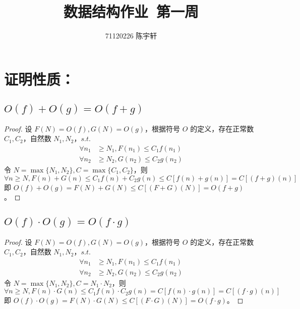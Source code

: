\documentclass{ctexart}
\author{71120226 陈宇轩}
\title{数据结构作业\ 第一周}
\begin{document}
    \maketitle

    \section{证明性质：}

    \subsection{$O(f) + O(g) = O(f + g)$}

    \begin{proof}
        设 $F(N) = O(f), G(N) = O(g)$，根据符号 $O$ 的定义，存在正常数 $C_1, C_2$，自然数 $N_1, N_2$，$s.t.$
        \[
            \begin{aligned}
                \forall n_1 &\geq N_1, F(n_1) \leq C_1f(n_1) \\
                \forall n_2 &\geq N_2, G(n_2) \leq C_2g(n_2) 
            \end{aligned}
        \]
        令 $N = \max\{N_1, N_2\}, C = \max\{C_1, C_2\}$，则
        \[
            \forall n \geq N, F(n) + G(n) \leq C_1f(n) + C_2g(n) \leq C[f(n) + g(n)] = C[(f + g)(n)]
        \]
        即 $O(f) + O(g) = F(N) + G(N) \leq C[(F + G)(N)] = O(f + g)$。
    \end{proof}

    \subsection{$O(f) \cdot O(g) = O(f \cdot g)$}

    \begin{proof}
        设 $F(N) = O(f), G(N) = O(g)$，根据符号 $O$ 的定义，存在正常数 $C_1, C_2$，自然数 $N_1, N_2$，$s.t.$
        \[
            \begin{aligned}
                \forall n_1 &\geq N_1, F(n_1) \leq C_1f(n_1) \\
                \forall n_2 &\geq N_2, G(n_2) \leq C_2g(n_2) 
            \end{aligned}
        \]
        令 $N = \max\{N_1, N_2\}, C = N_1 \cdot N_2$，则
        \[
            \forall n \geq N, F(n) \cdot G(n) \leq C_1f(n) \cdot C_2g(n) = C[f(n) \cdot g(n)] = C[(f \cdot g)(n)]
        \]
        即 $O(f) \cdot O(g) = F(N) \cdot G(N) \leq C[(F \cdot G)(N)] = O(f \cdot g)$。
    \end{proof}
\end{document}

